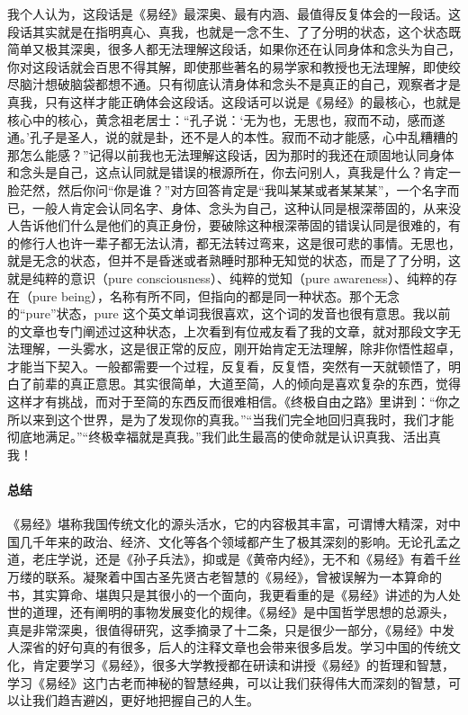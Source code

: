我个人认为，这段话是《易经》最深奥、最有内涵、最值得反复体会的一段话。这段话其实就是在指明真心、真我，也就是一念不生、了了分明的状态，这个状态既简单又极其深奥，很多人都无法理解这段话，如果你还在认同身体和念头为自己，你对这段话就会百思不得其解，即使那些著名的易学家和教授也无法理解，即使绞尽脑汁想破脑袋都想不通。只有彻底认清身体和念头不是真正的自己，观察者才是真我，只有这样才能正确体会这段话。这段话可以说是《易经》的最核心，也就是核心中的核心，黄念祖老居士：“孔子说：‘无为也，无思也，寂而不动，感而遂通。’孔子是圣人，说的就是卦，还不是人的本性。寂而不动才能感，心中乱糟糟的那怎么能感？”记得以前我也无法理解这段话，因为那时的我还在顽固地认同身体和念头是自己，这点认同就是错误的根源所在，你去问别人，真我是什么？肯定一脸茫然，然后你问“你是谁？”对方回答肯定是“我叫某某或者某某某”，一个名字而已，一般人肯定会认同名字、身体、念头为自己，这种认同是根深蒂固的，从来没人告诉他们什么是他们的真正身份，要破除这种根深蒂固的错误认同是很难的，有的修行人也许一辈子都无法认清，都无法转过弯来，这是很可悲的事情。无思也，就是无念的状态，但并不是昏迷或者熟睡时那种无知觉的状态，而是了了分明，这就是纯粹的意识（pure consciousness）、纯粹的觉知（pure awareness）、纯粹的存在（pure being），名称有所不同，但指向的都是同一种状态。那个无念的“pure”状态，pure 这个英文单词我很喜欢，这个词的发音也很有意思。我以前的文章也专门阐述过这种状态，上次看到有位戒友看了我的文章，就对那段文字无法理解，一头雾水，这是很正常的反应，刚开始肯定无法理解，除非你悟性超卓，才能当下契入。一般都需要一个过程，反复看，反复悟，突然有一天就顿悟了，明白了前辈的真正意思。其实很简单，大道至简，人的倾向是喜欢复杂的东西，觉得这样才有挑战，而对于至简的东西反而很难相信。《终极自由之路》里讲到：“你之所以来到这个世界，是为了发现你的真我。”“当我们完全地回归真我时，我们才能彻底地满足。”“终极幸福就是真我。”我们此生最高的使命就是认识真我、活出真我！

\paragraph{总结}

《易经》堪称我国传统文化的源头活水，它的内容极其丰富，可谓博大精深，对中国几千年来的政治、经济、文化等各个领域都产生了极其深刻的影响。无论孔孟之道，老庄学说，还是《孙子兵法》，抑或是《黄帝内经》，无不和《易经》有着千丝万缕的联系。凝聚着中国古圣先贤古老智慧的《易经》，曾被误解为一本算命的书，其实算命、堪舆只是其很小的一个面向，我更看重的是《易经》讲述的为人处世的道理，还有阐明的事物发展变化的规律。《易经》是中国哲学思想的总源头，真是非常深奥，很值得研究，这季摘录了十二条，只是很少一部分，《易经》中发人深省的好句真的有很多，后人的注释文章也会带来很多启发。学习中国的传统文化，肯定要学习《易经》，很多大学教授都在研读和讲授《易经》的哲理和智慧，学习《易经》这门古老而神秘的智慧经典，可以让我们获得伟大而深刻的智慧，可以让我们趋吉避凶，更好地把握自己的人生。


